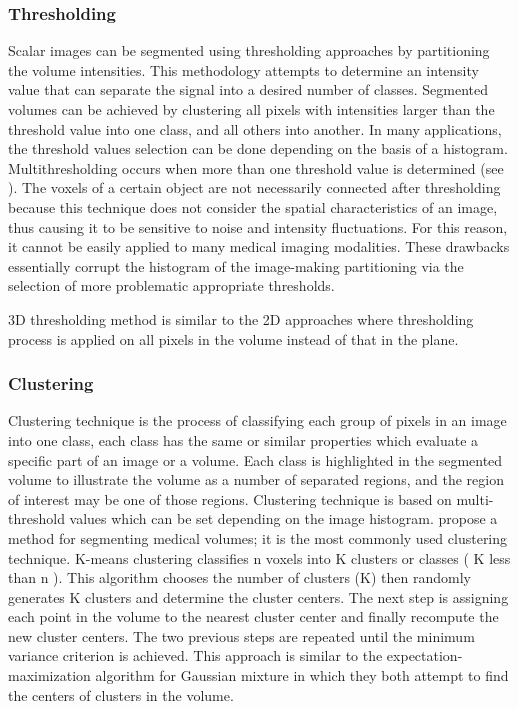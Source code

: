 \subsubsection{ Thresholding }
Scalar images can be segmented using thresholding approaches by partitioning the volume intensities. This methodology attempts to determine an intensity value that can separate the signal into a desired number of classes. Segmented volumes can be achieved by clustering all pixels with intensities larger than the threshold value into one class, and all others into another. In many applications, the threshold values selection can be done depending on the basis of a histogram. Multithresholding occurs when more than one threshold value is determined (see \cite{Sahoo:1988:STT:46072.46079}).
The voxels of a certain object are not necessarily connected after thresholding because this technique does not consider the spatial characteristics of an image, thus causing it to be sensitive to noise and intensity fluctuations. For this reason, it cannot be easily applied to many medical imaging modalities. These drawbacks essentially corrupt the histogram of the image-making partitioning via the selection of more problematic appropriate thresholds.

3D thresholding method is similar to the 2D approaches where thresholding process is applied on all pixels in the volume instead of that in the plane.


\subsubsection{ Clustering }
Clustering technique is the process of classifying each group of pixels in an image into one class, each class has the same or similar properties which evaluate a specific part of an image or a volume. Each class is highlighted in the segmented volume to illustrate the volume as a number of separated regions, and the region of interest may be one of those regions. Clustering technique is based on multi-threshold values which can be set depending on the image histogram. \cite{AMIRA20081954} propose a method for segmenting medical volumes; it is the most commonly used clustering technique.
K-means clustering classifies n voxels into K clusters or classes ( K less than n ). This algorithm chooses the number of clusters (K) then randomly generates K clusters and determine the cluster centers. The next step is assigning each point in the volume to the nearest cluster center and finally recompute the new cluster centers. The two previous steps are repeated until the minimum variance criterion is achieved. This approach is similar to the expectation-maximization algorithm for Gaussian mixture in which they both attempt to find the centers of clusters in the volume.

